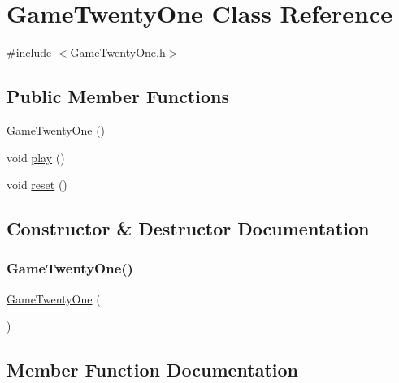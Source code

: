\hypertarget{class_game_twenty_one}{}\section{Game\+Twenty\+One Class Reference}
\label{class_game_twenty_one}


{\ttfamily \#include $<$Game\+Twenty\+One.\+h$>$}

\subsection*{Public Member Functions}
\begin{DoxyCompactItemize}
\item 
\mbox{\hyperlink{class_game_twenty_one_abe306df1260ed2423e867221a8350f8b}{Game\+Twenty\+One}} ()
\item 
void \mbox{\hyperlink{class_game_twenty_one_a6d58098c6cf63c241ed03bc797256bb1}{play}} ()
\item 
void \mbox{\hyperlink{class_game_twenty_one_ad20897c5c8bd47f5d4005989bead0e55}{reset}} ()
\end{DoxyCompactItemize}


\subsection{Constructor \& Destructor Documentation}
\mbox{\label{class_game_twenty_one_abe306df1260ed2423e867221a8350f8b}} 
\subsubsection{\texorpdfstring{GameTwentyOne()}{GameTwentyOne()}}
{\footnotesize\ttfamily \mbox{\hyperlink{class_game_twenty_one}{Game\+Twenty\+One}} (\begin{DoxyParamCaption}{ }\end{DoxyParamCaption})}



\subsection{Member Function Documentation}
\mbox{\label{class_game_twenty_one_a6d58098c6cf63c241ed03bc797256bb1}} 
